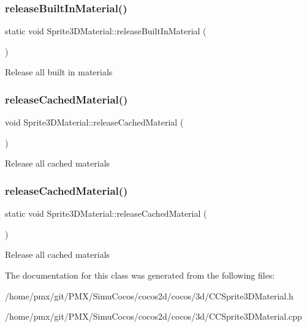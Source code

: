 \subsubsection{\texorpdfstring{release\+Built\+In\+Material()}{releaseBuiltInMaterial()}\hspace{0.1cm}{\footnotesize\ttfamily [2/2]}}
{\footnotesize\ttfamily static void Sprite3\+D\+Material\+::release\+Built\+In\+Material (\begin{DoxyParamCaption}{ }\end{DoxyParamCaption})\hspace{0.3cm}{\ttfamily [static]}}

Release all built in materials \mbox{\label{classSprite3DMaterial_a5dd36d74ecdaec81f8d02d66b6543eef}} 
\subsubsection{\texorpdfstring{release\+Cached\+Material()}{releaseCachedMaterial()}\hspace{0.1cm}{\footnotesize\ttfamily [1/2]}}
{\footnotesize\ttfamily void Sprite3\+D\+Material\+::release\+Cached\+Material (\begin{DoxyParamCaption}{ }\end{DoxyParamCaption})\hspace{0.3cm}{\ttfamily [static]}}

Release all cached materials \mbox{\label{classSprite3DMaterial_af9e4780a7202ba93932e8edd12fea60e}} 
\subsubsection{\texorpdfstring{release\+Cached\+Material()}{releaseCachedMaterial()}\hspace{0.1cm}{\footnotesize\ttfamily [2/2]}}
{\footnotesize\ttfamily static void Sprite3\+D\+Material\+::release\+Cached\+Material (\begin{DoxyParamCaption}{ }\end{DoxyParamCaption})\hspace{0.3cm}{\ttfamily [static]}}

Release all cached materials 

The documentation for this class was generated from the following files\+:\begin{DoxyCompactItemize}
\item 
/home/pmx/git/\+P\+M\+X/\+Simu\+Cocos/cocos2d/cocos/3d/C\+C\+Sprite3\+D\+Material.\+h\item 
/home/pmx/git/\+P\+M\+X/\+Simu\+Cocos/cocos2d/cocos/3d/C\+C\+Sprite3\+D\+Material.\+cpp\end{DoxyCompactItemize}
